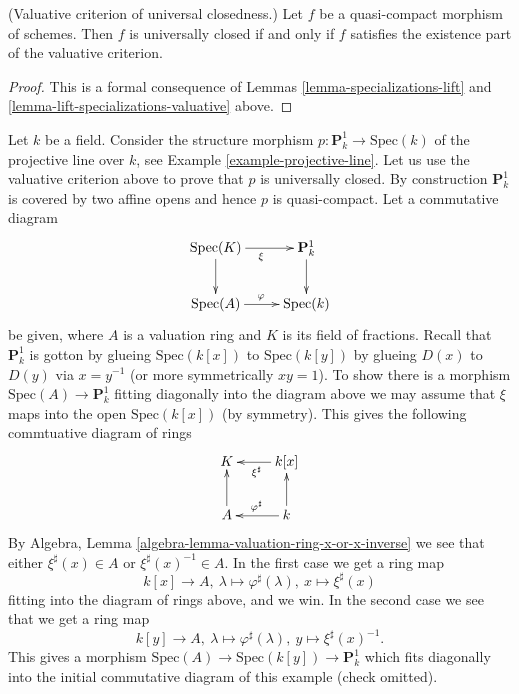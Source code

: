 \begin{proposition}
\label{proposition-characterize-universally-closed}
(Valuative criterion of universal closedness.)
Let $f$ be a quasi-compact morphism of schemes.
Then $f$ is universally closed if and only if $f$
satisfies the existence part of the valuative criterion.
\end{proposition}

\begin{proof}
This is a formal consequence of
Lemmas \ref{lemma-specializations-lift} and
\ref{lemma-lift-specializations-valuative} above.
\end{proof}

\begin{example}
\label{example-projective-line-universally-closed}
Let $k$ be a field. Consider the structure morphism
$p : \mathbf{P}^1_k \to \text{Spec}(k)$ of the projective
line over $k$, see Example \ref{example-projective-line}.
Let us use the valuative criterion above to prove that $p$
is universally closed.
By construction $\mathbf{P}^1_k$ is covered by two
affine opens and hence $p$ is quasi-compact.
Let a commutative diagram
$$
\xymatrix{
\text{Spec}(K) \ar[r]_\xi \ar[d] & \mathbf{P}^1_k \ar[d] \\
\text{Spec}(A) \ar[r]^\varphi & \text{Spec}(k)
}
$$
be given, where $A$ is a valuation ring and $K$ is its field
of fractions. Recall that $\mathbf{P}^1_k$ is gotton by glueing
$\text{Spec}(k[x])$ to $\text{Spec}(k[y])$ by glueing
$D(x)$ to $D(y)$ via $x = y^{-1}$ (or more symmetrically $xy = 1$).
To show there is a morphism $\text{Spec}(A) \to \mathbf{P}^1_k$
fitting diagonally into the diagram above we may assume that $\xi$
maps into the open $\text{Spec}(k[x])$ (by symmetry). This gives the following
commtuative diagram of rings
$$
\xymatrix{
K & \ar[l]^{\xi^\sharp} k[x] \\
A \ar[u] & k \ar[u] \ar[l]_{\varphi^\sharp}
}
$$
By Algebra, Lemma \ref{algebra-lemma-valuation-ring-x-or-x-inverse}
we see that either
$\xi^\sharp(x) \in A$ or $\xi^\sharp(x)^{-1} \in A$.
In the first case we get a ring map
$$
k[x] \to A, \ 
\lambda \mapsto \varphi^\sharp(\lambda), \ 
x \mapsto \xi^\sharp(x)
$$
fitting into the diagram of rings above, and we win.
In the second case we see that we get a ring map
$$
k[y] \to A, \ 
\lambda \mapsto \varphi^\sharp(\lambda), \ 
y \mapsto \xi^\sharp(x)^{-1}.
$$
This gives a morphism
$\text{Spec}(A) \to \text{Spec}(k[y]) \to \mathbf{P}^1_k$
which fits diagonally into the initial commutative diagram of this example
(check omitted).
\end{example}





























